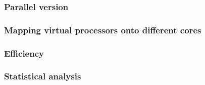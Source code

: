\subsubsection*{Parallel version}
\subsubsection*{Mapping virtual processors onto different cores} 
\subsubsection*{Efficiency} 
\subsubsection*{Statistical analysis}

